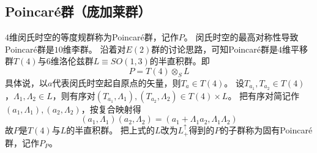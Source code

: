 \subsection{Poincaré群（庞加莱群）}

$4$维闵氏时空的等度规群称为Poincaré群，记作$P$。
闵氏时空的最高对称性导致Poincaré群是$10$维李群。
沿着对$E(2)$群的讨论思路，可知Poincaré群是$4$维平移群$T(4)$与$6$维洛伦兹群$L \equiv SO(1, 3)$的半直积群。即
$$P = T(4) \otimes_S L$$
具体说，以$a$代表闵氏时空起自原点的矢量，则$T_a \in T(4)$。
设$T_{a_1}, T_{a_2} \in T(4)$，$\Lambda_1, \Lambda_2 \in L$，则有序对$(T_{a_1}, \Lambda_1),(T_{a_2}, \Lambda_2) \in T(4) \times L$。
把有序对简记作$(a_1, \Lambda_1), (a_2, \Lambda_2)$，按复合映射得
$$(a_1, \Lambda_1)(a_2, \Lambda_2) = (a_1 + \Lambda_1a_2, \Lambda_1\Lambda_2)$$
故$P$是$T(4)$与$L$的半直积群。
把上式的$L$改为$L^\uparrow_+$得到的$P$的子群称为固有Poincaré群，记作$P_P$。

